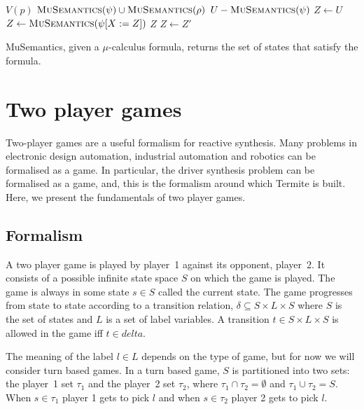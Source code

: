 \begin{algorithm}
\begin{algorithmic}

        \State\Return $V(p)$
    \ElsIf {$\phi = \psi \vee \rho$}
        \State\Return $\Call{MuSemantics}{\psi} \cup \Call{MuSemantics}{\rho}$
    \ElsIf {$\phi = \neg \psi$}
        \State\Return $U - \Call{MuSemantics}{\psi}$
        \State $Z \gets U$
        \Loop
            \State $Z \gets \Call{MuSemantics}{\psi[X:=Z]}$
                \State\Return $Z$
            \EndIf
            \State $Z \gets Z'$
        \EndLoop
    \EndIf
\EndFunction

\end{algorithmic}
\caption{MuSemantics, given a $\mu$-calculus formula, returns the set of states that satisfy the formula.}
\label{a:mu_semantics}
\end{algorithm}

\section{Two player games}

Two-player games are a useful formalism for reactive synthesis. Many problems in electronic design automation, industrial automation and robotics can be formalised as a game. In particular, the driver synthesis problem can be formalised as a game, and, this is the formalism around which Termite is built. Here, we present the fundamentals of two player games. 

\subsection{Formalism}

A two player game is played by player~1 against its opponent, player~2. It consists of a possible infinite state space $S$ on which the game is played. The game is always in some state $s \in S$ called the current state. The game progresses from state to state according to a transition relation, $\delta \subseteq S \times L \times S$ where $S$ is the set of states and $L$ is a set of label variables. A transition $t \in S \times L \times S$ is allowed in the game iff $t \in delta$. 

The meaning of the label $l \in L$ depends on the type of game, but for now we will consider turn based games. In a turn based game, $S$ is partitioned into two sets: the player~1 set $\tau_1$ and the player~2 set $\tau_2$, where $\tau_1 \cap \tau_2 = \emptyset$ and $ \tau_1 \cup \tau_2 = S$. When $s \in \tau_1$ player 1 gets to pick $l$ and when $s \in \tau_2$ player 2 gets to pick $l$.

